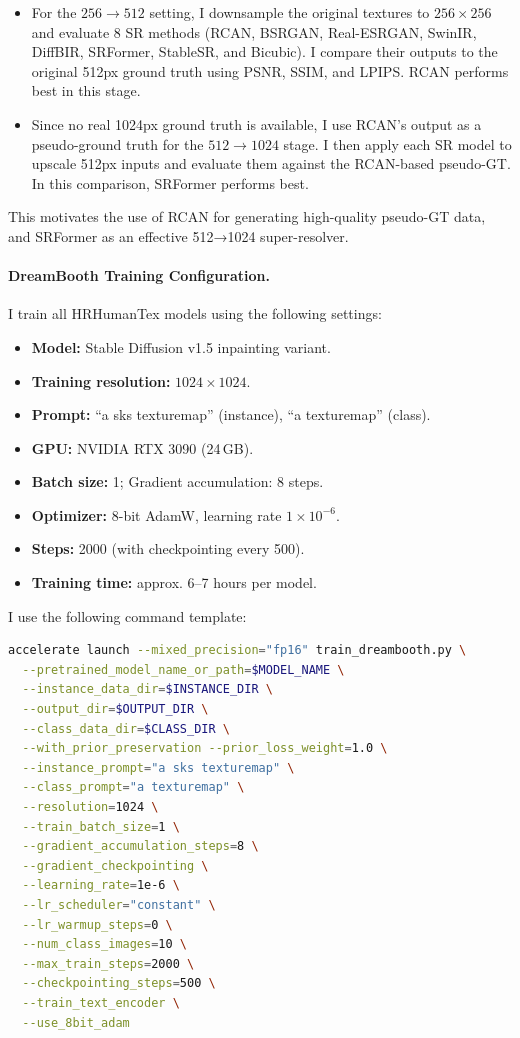 \begin{itemize}
    \item For the $256 \rightarrow 512$ setting, I downsample the original textures to $256\times256$ and evaluate 8 SR methods (RCAN, BSRGAN, Real-ESRGAN, SwinIR, DiffBIR, SRFormer, StableSR, and Bicubic). I compare their outputs to the original 512px ground truth using PSNR, SSIM, and LPIPS. RCAN performs best in this stage.
    \item Since no real 1024px ground truth is available, I use RCAN's output as a pseudo-ground truth for the $512 \rightarrow 1024$ stage. I then apply each SR model to upscale 512px inputs and evaluate them against the RCAN-based pseudo-GT. In this comparison, SRFormer performs best.
\end{itemize}

This motivates the use of RCAN for generating high-quality pseudo-GT data, and SRFormer as an effective 512→1024 super-resolver.

\paragraph{DreamBooth Training Configuration.}
I train all HRHumanTex models using the following settings:

\begin{itemize}
    \item \textbf{Model:} Stable Diffusion v1.5 inpainting variant.
    \item \textbf{Training resolution:} $1024\times1024$.
    \item \textbf{Prompt:} ``a sks texturemap'' (instance), ``a texturemap'' (class).
    \item \textbf{GPU:} NVIDIA RTX 3090 (24\,GB).
    \item \textbf{Batch size:} 1; Gradient accumulation: 8 steps.
    \item \textbf{Optimizer:} 8-bit AdamW, learning rate $1 \times 10^{-6}$.
    \item \textbf{Steps:} 2000 (with checkpointing every 500).
    \item \textbf{Training time:} approx. 6–7 hours per model.
\end{itemize}

I use the following command template:

\begin{lstlisting}[language=bash]
accelerate launch --mixed_precision="fp16" train_dreambooth.py \
  --pretrained_model_name_or_path=$MODEL_NAME \
  --instance_data_dir=$INSTANCE_DIR \
  --output_dir=$OUTPUT_DIR \
  --class_data_dir=$CLASS_DIR \
  --with_prior_preservation --prior_loss_weight=1.0 \
  --instance_prompt="a sks texturemap" \
  --class_prompt="a texturemap" \
  --resolution=1024 \
  --train_batch_size=1 \
  --gradient_accumulation_steps=8 \
  --gradient_checkpointing \
  --learning_rate=1e-6 \
  --lr_scheduler="constant" \
  --lr_warmup_steps=0 \
  --num_class_images=10 \
  --max_train_steps=2000 \
  --checkpointing_steps=500 \
  --train_text_encoder \
  --use_8bit_adam
\end{lstlisting}

